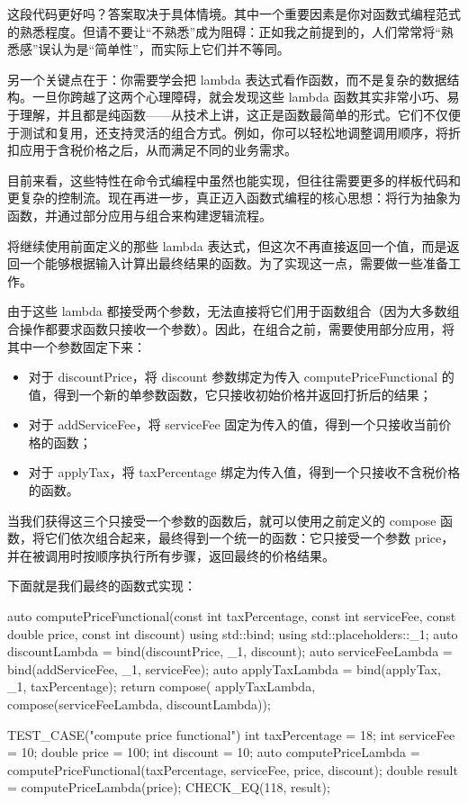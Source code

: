 这段代码更好吗？答案取决于具体情境。其中一个重要因素是你对函数式编程范式的熟悉程度。但请不要让“不熟悉”成为阻碍：正如我之前提到的，人们常常将“熟悉感”误认为是“简单性”，而实际上它们并不等同。

另一个关键点在于：你需要学会把 lambda 表达式看作函数，而不是复杂的数据结构。一旦你跨越了这两个心理障碍，就会发现这些 lambda 函数其实非常小巧、易于理解，并且都是纯函数——从技术上讲，这正是函数最简单的形式。它们不仅便于测试和复用，还支持灵活的组合方式。例如，你可以轻松地调整调用顺序，将折扣应用于含税价格之后，从而满足不同的业务需求。

目前来看，这些特性在命令式编程中虽然也能实现，但往往需要更多的样板代码和更复杂的控制流。现在再进一步，真正迈入函数式编程的核心思想：将行为抽象为函数，并通过部分应用与组合来构建逻辑流程。

将继续使用前面定义的那些 lambda 表达式，但这次不再直接返回一个值，而是返回一个能够根据输入计算出最终结果的函数。为了实现这一点，需要做一些准备工作。

由于这些 lambda 都接受两个参数，无法直接将它们用于函数组合（因为大多数组合操作都要求函数只接收一个参数）。因此，在组合之前，需要使用部分应用，将其中一个参数固定下来：

\begin{itemize}
\item 
对于 discountPrice，将 discount 参数绑定为传入 computePriceFunctional 的值，得到一个新的单参数函数，它只接收初始价格并返回打折后的结果；

\item 
对于 addServiceFee，将 serviceFee 固定为传入的值，得到一个只接收当前价格的函数；

\item 
对于 applyTax，将 taxPercentage 绑定为传入值，得到一个只接收不含税价格的函数。
\end{itemize}

当我们获得这三个只接受一个参数的函数后，就可以使用之前定义的 compose 函数，将它们依次组合起来，最终得到一个统一的函数：它只接受一个参数 price，并在被调用时按顺序执行所有步骤，返回最终的价格结果。

下面就是我们最终的函数式实现：

\begin{cpp}
auto computePriceFunctional(const int taxPercentage, const int
serviceFee, const double price, const int discount){
  using std::bind;
  using std::placeholders::_1;
  auto discountLambda = bind(discountPrice, _1, discount);
  auto serviceFeeLambda = bind(addServiceFee, _1, serviceFee);
  auto applyTaxLambda = bind(applyTax, _1, taxPercentage);
  return compose( applyTaxLambda, compose(serviceFeeLambda,
  discountLambda));
}

TEST_CASE("compute price functional"){
  int taxPercentage = 18;
  int serviceFee = 10;
  double price = 100;
  int discount = 10;
  auto computePriceLambda = computePriceFunctional(taxPercentage,
  serviceFee, price, discount);
  double result = computePriceLambda(price);
  CHECK_EQ(118, result);
}
\end{cpp}

